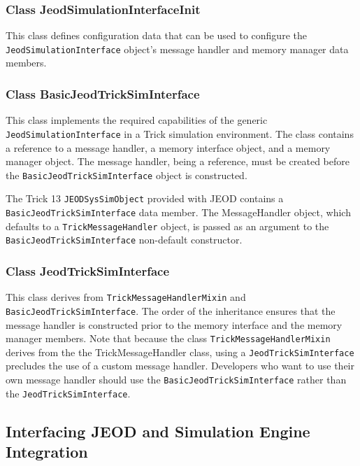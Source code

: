 \subsubsection{Class JeodSimulationInterfaceInit}
This class defines configuration data that can be used to
configure the \verb|JeodSimulationInterface| object's
message handler and memory manager data members.

\subsubsection{Class BasicJeodTrickSimInterface}
This class implements the required capabilities of the
generic \verb|JeodSimulationInterface| in a Trick simulation environment.
The class contains a reference to a message handler,
a memory interface object, and a memory manager object.
The message handler, being a reference, must be created before
the \verb|BasicJeodTrickSimInterface| object is constructed.

The Trick 13 \verb|JEODSysSimObject| provided with JEOD contains a
\verb|BasicJeodTrickSimInterface| data member. The MessageHandler object,
which defaults to a \verb|TrickMessageHandler| object, is passed as an argument
to the \verb|BasicJeodTrickSimInterface| non-default constructor.

\subsubsection{Class JeodTrickSimInterface}
This class derives from \verb|TrickMessageHandlerMixin| and
\verb|BasicJeodTrickSimInterface|.
The order of the inheritance ensures that the message handler is
constructed prior to the memory interface and the memory manager members.
Note that because the class \verb|TrickMessageHandlerMixin| derives from the
the TrickMessageHandler class, using a \verb|JeodTrickSimInterface| precludes
the use of a custom message handler. Developers who want to use their own
message handler should use the \verb|BasicJeodTrickSimInterface| rather than
the \verb|JeodTrickSimInterface|.

\subsection{Interfacing JEOD and Simulation Engine Integration}
